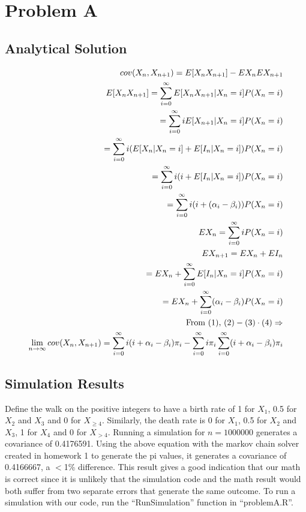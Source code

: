 \documentclass{article}
\begin{document}
\section{Problem A}
\subsection{Analytical Solution}
\begin{align}
cov(X_n,X_{n+1})=E[X_nX_{n+1}]-EX_nEX_{n+1} \\
E[X_nX_{n+1}]=\sum_{i=0}^{\infty}E[X_nX_{n+1}|X_n=i]P(X_n=i) \\
=\sum_{i=0}^{\infty}iE[X_{n+1}|X_n=i]P(X_n=i) \notag\\
=\sum_{i=0}^{\infty}i(E[X_n|X_n=i]+E[I_n|X_n=i])P(X_n=i) \notag\\
=\sum_{i=0}^{\infty}i(i+E[I_n|X_n=i])P(X_n=i) \notag\\
=\sum_{i=0}^{\infty}i(i+(\alpha_i-\beta_i))P(X_n=i) \notag\\
EX_n=\sum_{i=0}^{\infty}iP(X_n=i) \\
EX_{n+1}=EX_n+EI_n \\
=EX_n+\sum_{i=0}^{\infty}E[I_n|X_n=i]P(X_n=i) \notag\\
=EX_n+\sum_{i=0}^{\infty}(\alpha_i-\beta_i)P(X_n=i) \notag\\
\text{From (1), }(2)-(3)\cdot(4)\Rightarrow \notag\\
\lim_{n\rightarrow\infty}cov(X_n,X_{n+1})=\sum_{i=0}^{\infty}i(i+\alpha_i-\beta_i)\pi_i-\sum_{i=0}^{\infty}i\pi_i\sum_{i=0}^{\infty}(i+\alpha_i-\beta_i)\pi_i
\end{align}
\subsection{Simulation Results}

Define the walk on the positive integers to have a birth rate of 1 for $X_1$, 0.5 for $X_2$ and $X_3$ and 0 for $X_{\geq4}$. Similarly, the death rate is 0 for $X_1$, 0.5 for $X_2$ and $X_3$, 1 for $X_4$ and 0 for $X_{>4}$. Running a simulation for $n = 1000000$ generates a covariance of 0.4176591. Using the above equation with the markov chain solver created in homework 1 to generate the pi values, it generates a covariance of 0.4166667, a $<$1\% difference. This result gives a good indication that our math is correct since it is unlikely that the simulation code and the math result would both suffer from two separate errors that generate the same outcome. To run a simulation with our code, run the ``RunSimulation'' function in ``problemA.R''.
\end{document}
